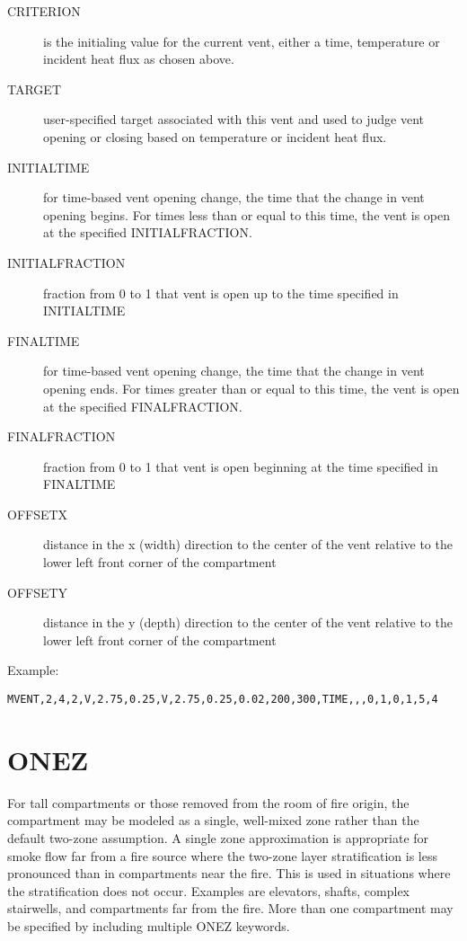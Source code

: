 \begin{adjustwidth}{1cm}{0cm}
\begin{description}
  \item[CRITERION] is the initialing value for the current vent, either a time, temperature or incident heat flux as chosen above.
  \item[TARGET] user-specified target associated with this vent and used to judge vent opening or closing based on temperature or incident heat flux.
  \item[INITIALTIME] for time-based vent opening change, the time that the change in vent opening begins. For times less than or equal to this time, the vent is open at the specified INITIALFRACTION.
  \item[INITIALFRACTION] fraction from 0 to 1 that vent is open up to the time specified in INITIALTIME
  \item[FINALTIME] for time-based vent opening change, the time that the change in vent opening ends. For times greater than or equal to this time, the vent is open at the specified FINALFRACTION.
  \item[FINALFRACTION] fraction from 0 to 1 that vent is open beginning at the time specified in FINALTIME
  \item[OFFSETX] distance in the x (width) direction to the center of the vent relative to the lower left front corner of the compartment
  \item[OFFSETY] distance in the y (depth) direction to the center of the vent relative to the lower left front corner of the compartment
\end{description}
\end{adjustwidth}

\noindent Example:

\begin{lstlisting}
MVENT,2,4,2,V,2.75,0.25,V,2.75,0.25,0.02,200,300,TIME,,,0,1,0,1,5,4
\end{lstlisting}

\section{ONEZ}

For tall compartments or those removed from the room of fire origin, the compartment may be modeled as a single, well-mixed zone rather than the default two-zone assumption. A single zone approximation is appropriate for smoke flow far from a fire source where the two-zone layer stratification is less pronounced than in compartments near the fire. This is used in situations where the stratification does not occur. Examples are elevators, shafts, complex stairwells, and compartments far from the fire. More than one compartment may be specified by including multiple ONEZ keywords.

